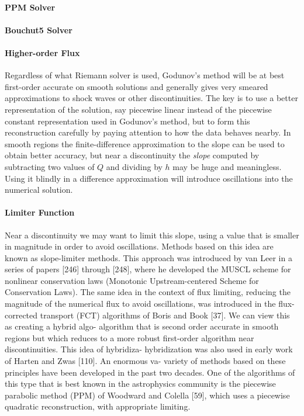 \paragraph {PPM Solver}

\paragraph {Bouchut5 Solver}


\paragraph{Higher-order Flux}
Regardless of what Riemann solver is used, Godunov's method will be at best
first-order accurate on smooth solutions and generally gives very smeared
approximations to shock waves or other discontinuities. The key is to use a
better representation of the solution, say piecewise linear instead of the
piecewise constant representation used in Godunov's method, but to form
this reconstruction carefully by paying attention to how the data behaves
nearby. In smooth regions the finite-difference approximation to the slope
can be used to obtain better accuracy, but near a discontinuity the \emph{slope}
computed by subtracting two values of $Q$ and dividing by $h$ may be huge and
meaningless. Using it blindly in a difference approximation will introduce
oscillations into the numerical solution.

\paragraph{Limiter Function}
Near a discontinuity we may want to limit this slope, using
a value that is smaller in magnitude in order to avoid oscillations. Methods
based on this idea are known as slope-limiter methods. This approach was
introduced by van Leer in a series of papers [246] through [248], where he
developed the MUSCL scheme for nonlinear conservation laws (Monotonic
Upstream-centered Scheme for Conservation Laws). The same idea in the
context of flux limiting, reducing the magnitude of the numerical flux to
avoid oscillations, was introduced in the flux-corrected transport (FCT)
algorithms of Boris and Book [37]. We can view this as creating a hybrid algo-
algorithm that is second order accurate in smooth regions but which reduces to a
more robust first-order algorithm near discontinuities. This idea of hybridiza-
hybridization was also used in early work of Harten and Zwas [110]. An enormous va-
variety of methods based on these principles have been developed in the past
two decades. One of the algorithms of this type that is best known in the
astrophysics community is the piecewise parabolic method (PPM) of
Woodward and Colella [59], which uses a piecewise quadratic reconstruction,
with appropriate limiting.
